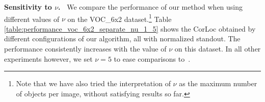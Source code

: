 \documentclass[10pt,twocolumn,letterpaper]{article}
\numberwithin{theorem}{section}
\newcommand{\parag}[1]{\vspace{4pt}\noindent\textbf{#1~}}
\begin{document}
\parag{Sensitivity to $\nu$.} 
We compare the performance of our method when using different values of $\nu$ on the VOC\_6x2 dataset.\footnote{Note that we have also tried the interpretation of $\nu$ as the maximum number of objects per image, without satisfying results so far.} Table \ref{table:performance_voc_6x2_separate_nu_1_5} shows the CorLoc obtained by different configurations of our algorithm, all with normalized standout. The performance consistently increases with the value of $\nu$ on this dataset. In all other experiments however, we set $\nu=5$ to ease comparisons to~\cite{CKSP15}.
\begin{table}
\centering
{}
\vspace{-2mm}
\caption{\small Performance of different configurations of our algorithm with $\nu=1$, $\nu=5$ and $\nu=10$.}
\label{table:performance_voc_6x2_separate_nu_1_5}
\vspace{-4mm}
\end{table}
\end{document}
